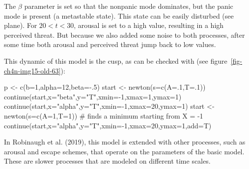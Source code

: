 \documentclass[
  a4paper,
  DIV=11,
  numbers=noendperiod,
  oneside]{scrreprt}
\newenvironment{Shaded}{}{}
\newcommand{\AttributeTok}[1]{\textcolor[rgb]{0.84,0.23,0.29}{#1}}
\newcommand{\CommentTok}[1]{\textcolor[rgb]{0.42,0.45,0.49}{#1}}
\newcommand{\DecValTok}[1]{\textcolor[rgb]{0.00,0.36,0.77}{#1}}
\newcommand{\FunctionTok}[1]{\textcolor[rgb]{0.44,0.26,0.76}{#1}}
\newcommand{\NormalTok}[1]{\textcolor[rgb]{0.14,0.16,0.18}{#1}}
\newcommand{\OtherTok}[1]{\textcolor[rgb]{0.44,0.26,0.76}{#1}}
\newcommand{\SpecialCharTok}[1]{\textcolor[rgb]{0.00,0.36,0.77}{#1}}
\newcommand{\StringTok}[1]{\textcolor[rgb]{0.01,0.18,0.38}{#1}}
\begin{document}
The \(\beta\) parameter is set so that the nonpanic mode dominates, but
the panic mode is present (a metastable state). This state can be easily
disturbed (see plane). For \(20 < t < 30\), arousal is set to a high
value, resulting in a high perceived threat. But because we also added
some noise to both processes, after some time both arousal and perceived
threat jump back to low values.

This dynamic of this model is the cusp, as can be checked with (see
figure~\ref{fig-ch4n-img15-old-63}):

\begin{Shaded}
\begin{Highlighting}[]
\NormalTok{p }\OtherTok{\textless{}{-}} \FunctionTok{c}\NormalTok{(}\AttributeTok{b=}\DecValTok{1}\NormalTok{,}\AttributeTok{alpha=}\DecValTok{12}\NormalTok{,}\AttributeTok{beta=}\SpecialCharTok{{-}}\NormalTok{.}\DecValTok{5}\NormalTok{)}
\NormalTok{start }\OtherTok{\textless{}{-}} \FunctionTok{newton}\NormalTok{(}\AttributeTok{s=}\FunctionTok{c}\NormalTok{(}\AttributeTok{A=}\NormalTok{.}\DecValTok{1}\NormalTok{,}\AttributeTok{T=}\NormalTok{.}\DecValTok{1}\NormalTok{)) }
\FunctionTok{continue}\NormalTok{(start,}\AttributeTok{x=}\StringTok{"beta"}\NormalTok{,}\AttributeTok{y=}\StringTok{"T"}\NormalTok{,}\AttributeTok{xmin=}\SpecialCharTok{{-}}\DecValTok{1}\NormalTok{,}\AttributeTok{xmax=}\DecValTok{1}\NormalTok{,}\AttributeTok{ymax=}\DecValTok{1}\NormalTok{) }
\FunctionTok{continue}\NormalTok{(start,}\AttributeTok{x=}\StringTok{"alpha"}\NormalTok{,}\AttributeTok{y=}\StringTok{"T"}\NormalTok{,}\AttributeTok{xmin=}\SpecialCharTok{{-}}\DecValTok{1}\NormalTok{,}\AttributeTok{xmax=}\DecValTok{20}\NormalTok{,}\AttributeTok{ymax=}\DecValTok{1}\NormalTok{) }
\NormalTok{start }\OtherTok{\textless{}{-}} \FunctionTok{newton}\NormalTok{(}\AttributeTok{s=}\FunctionTok{c}\NormalTok{(}\AttributeTok{A=}\DecValTok{1}\NormalTok{,}\AttributeTok{T=}\DecValTok{1}\NormalTok{)) }\CommentTok{\# finds a minimum starting from X = {-}1}
\FunctionTok{continue}\NormalTok{(start,}\AttributeTok{x=}\StringTok{"alpha"}\NormalTok{,}\AttributeTok{y=}\StringTok{"T"}\NormalTok{,}\AttributeTok{xmin=}\SpecialCharTok{{-}}\DecValTok{1}\NormalTok{,}\AttributeTok{xmax=}\DecValTok{20}\NormalTok{,}\AttributeTok{ymax=}\DecValTok{1}\NormalTok{,}\AttributeTok{add=}\NormalTok{T) }
\end{Highlighting}
\end{Shaded}

In Robinaugh et al. (2019), this model is extended with other processes,
such as arousal and escape schemes, that operate on the parameters of
the basic model. These are slower processes that are modeled on
different time scales.
\end{document}
